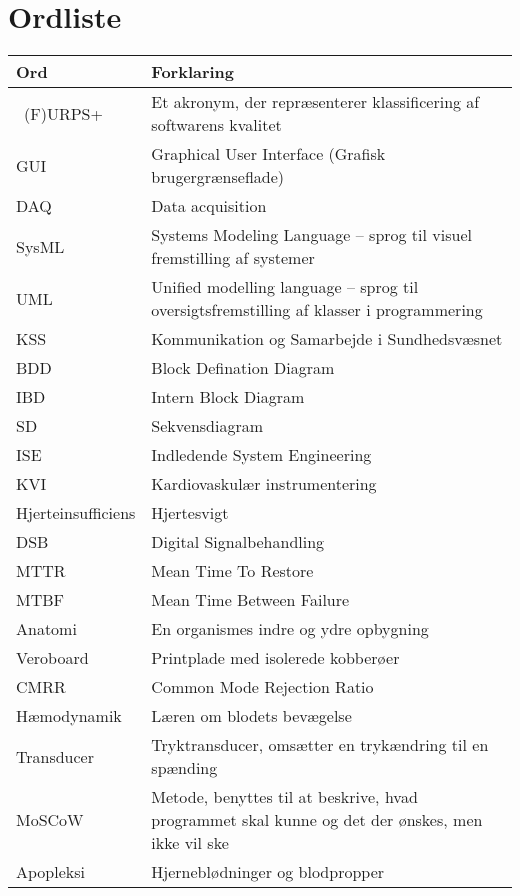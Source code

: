 \chapter{Ordliste}

\begin{longtabu} to 
    Ord &    Forklaring\\
    \toprule\
    (F)URPS+ &	Et akronym, der repræsenterer klassificering af softwarens kvalitet \\
    GUI		&	Graphical User Interface (Grafisk brugergrænseflade)\\
    DAQ		&	Data acquisition \\
    SysML	&   Systems Modeling Language – sprog til visuel fremstilling af systemer \\
    UML		& Unified modelling language – sprog til oversigtsfremstilling af klasser i programmering \\
    KSS		&	Kommunikation og Samarbejde i Sundhedsvæsnet \\
    BDD 	&	Block Defination Diagram \\
	IBD		& 	Intern Block Diagram \\
	SD		& 	Sekvensdiagram \\
	ISE 	&	Indledende System Engineering \\
	KVI		&	Kardiovaskulær instrumentering \\
	Hjerteinsufficiens &  Hjertesvigt \\
	DSB		&	Digital Signalbehandling \\
	MTTR	&	Mean Time To Restore \\
	MTBF	&	Mean Time Between Failure \\
	Anatomi & 	En organismes indre og ydre opbygning \\
	Veroboard &	Printplade med isolerede kobberøer \\
	CMRR	&	Common Mode Rejection Ratio \\
	Hæmodynamik & Læren om blodets bevægelse\\
	Transducer & Tryktransducer, omsætter en trykændring til en spænding \\  
	MoSCoW		& Metode, benyttes til at beskrive, hvad programmet skal kunne og det der ønskes, men ikke vil ske\\
	Apopleksi & Hjerneblødninger og blodpropper
\label{forkort}
\end{longtabu}